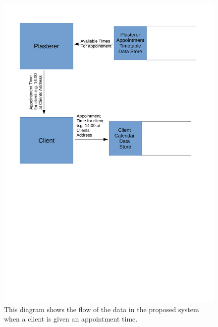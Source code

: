 \begin{figure}[H]
\includegraphics[width=\textwidth]{./Analysis/images/proposedSystemGivingClientAppointmentTime.pdf}
    \caption{This diagram shows the flow of the data in the proposed system when a client is given an appointment time.} \label{fig:proposed_system_dfd_3}
\end{figure}


